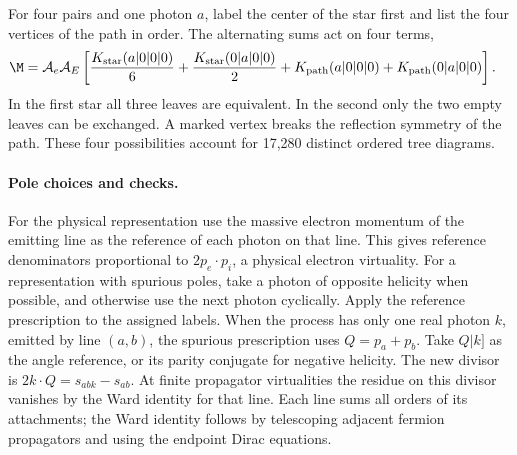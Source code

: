 For four pairs and one photon $a$, label the center of the star first
and list the four vertices of the path in order. The alternating sums
act on four terms,
\begin{align}
 \M={}&\mathcal A_e\mathcal A_E\left[
 \frac{K_{\rm star}(a|0|0|0)}6+\frac{K_{\rm star}(0|a|0|0)}2
 +K_{\rm path}(a|0|0|0)+K_{\rm path}(0|a|0|0)\right].
 \label{eq:nine-four-pairs}
\end{align}
In the first star all three leaves are equivalent. In the second only
the two empty leaves can be exchanged. A marked vertex breaks the
reflection symmetry of the path. These four possibilities account for
17,280 distinct ordered tree diagrams.

\paragraph{Pole choices and checks.}
For the physical representation use the massive electron momentum of
the emitting line as the reference of each photon on that line. This
gives reference denominators proportional to $2p_e\cdot p_i$, a
physical electron virtuality. For a representation with spurious poles,
take a photon of opposite helicity when possible, and otherwise use
the next photon cyclically. Apply the reference prescription to the
assigned labels. When the process has only one real photon $k$, emitted by line $(a,b)$, the spurious prescription
uses $Q=p_a+p_b$. Take $Q|k]$ as the angle reference, or its parity
conjugate for negative helicity. The new divisor is
$2k\cdot Q=s_{abk}-s_{ab}$. At finite propagator virtualities the
residue on this divisor vanishes by the Ward identity for that line. Each line sums all orders
of its attachments; the Ward identity follows by telescoping adjacent
fermion propagators and using the endpoint Dirac equations.

